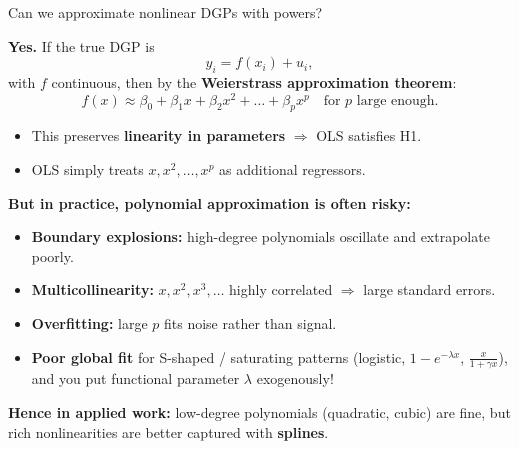 \documentclass{beamer}
\begin{document}
\begin{frame}{Can we approximate nonlinear DGPs with powers?}
\footnotesize

\textbf{Yes.}  
If the true DGP is 
\[
y_i = f(x_i) + u_i,
\]
with $f$ continuous, then by the \textbf{Weierstrass approximation theorem}:
\[
f(x) \approx \beta_0 + \beta_1 x + \beta_2 x^2 + \dots + \beta_p x^p
\quad \text{for $p$ large enough.}
\]

\begin{itemize}
  \item This preserves \textbf{linearity in parameters} $\Rightarrow$ OLS satisfies H1.
  \item OLS simply treats $x, x^2, \dots, x^p$ as additional regressors.
\end{itemize}

\pause
\textbf{But in practice, polynomial approximation is often risky:}
\begin{itemize}
  \item \textbf{Boundary explosions:} high-degree polynomials oscillate and extrapolate poorly.
  \item \textbf{Multicollinearity:} $x, x^2, x^3,\dots$ highly correlated $\Rightarrow$ large standard errors.
  \item \textbf{Overfitting:} large $p$ fits noise rather than signal.
  \item \textbf{Poor global fit} for S-shaped / saturating patterns (logistic, $1-e^{-\lambda x}$, $\frac{x}{1+\gamma x}$), and you put functional parameter $\lambda$ exogenously!
\end{itemize}

\textbf{Hence in applied work:} low-degree polynomials (quadratic, cubic) are fine, but rich nonlinearities are better captured with \textbf{splines}.


\end{frame}
\end{document}
